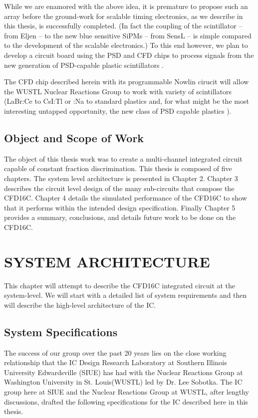 \documentclass[12pt,oneside,final]{siuethesis}
\theoremstyle{definition}
\begin{document}
While we are enamored with the above idea, it is premature to propose such an array before the ground-work for scalable timing electronics, as we describe in this thesis, is successfully completed. (In fact the coupling of the scintillator – from Eljen – to the new blue sensitive SiPMs – from SensL – is simple compared to the development of the scalable electronics.) To this end however, we plan to develop a circuit board using the PSD and CFD chips to process signals from the new generation of PSD-capable plastic scintillators \cite{ZAITSEVA}. 

The CFD chip described herein with its programmable Nowlin cirucit will allow the WUSTL Nuclear Reactions Group to work with variety of scintillators (LaBr:Ce to CsI:Tl or :Na to standard plastics and, for what might be the most interesting untapped opportunity, the new class of PSD capable plastics \cite{ZAITSEVA}).  


\section{Object and Scope of Work} 

\par The object of this thesis work was to create a multi-channel integrated circuit capable of constant fraction discrimination. This thesis is composed of five chapters. The system level architecture is presented in Chapter 2. Chapter 3 describes the circuit level design of the many sub-circuits that compose the CFD16C. Chapter 4 details the simulated performance of the CFD16C to show that it performs within the intended design specification. Finally Chapter 5 provides a summary, conclusions, and details future work to be done on the CFD16C.



\chapter{SYSTEM ARCHITECTURE}

This chapter will attempt to describe the CFD16C integrated circuit at the system-level.  We will start with a detailed list of system requirements and then will describe the high-level architecture of the IC.

\section{System Specifications}
The success of our group over the past 20 years lies on the close working relationship that the IC Design Research Laboratory at Southern Illinois University Edwardsville (SIUE) has had with the Nuclear Reactions Group at Washington University in St. Louis(WUSTL) led by Dr. Lee Sobotka.  The IC group here at SIUE and the Nuclear Reactions Group at WUSTL, after lengthy discussions, drafted the following specifications for the IC described here in this thesis.
\end{document}
